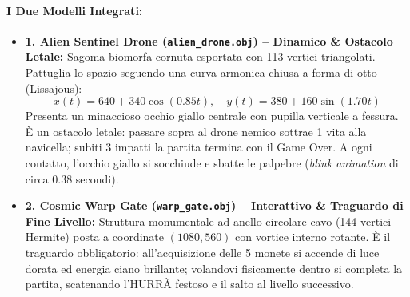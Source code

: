 \documentclass[11pt,a4paper]{article}
\begin{document}
\paragraph{I Due Modelli Integrati:}
\begin{itemize}
    \item \textbf{1. Alien Sentinel Drone (\texttt{alien\_drone.obj}) -- Dinamico \& Ostacolo Letale:}
    Sagoma biomorfa cornuta esportata con 113 vertici triangolati. Pattuglia lo spazio seguendo una curva armonica chiusa a forma di otto (Lissajous):
    \begin{equation}
    x(t) = 640 + 340 \cos(0.85 t), \quad y(t) = 380 + 160 \sin(1.70 t)
    \end{equation}
    Presenta un minaccioso occhio giallo centrale con pupilla verticale a fessura. È un ostacolo letale: passare sopra al drone nemico sottrae 1 vita alla navicella; subiti 3 impatti la partita termina con il Game Over. A ogni contatto, l'occhio giallo si socchiude e sbatte le palpebre (\textit{blink animation} di circa 0.38 secondi).
    \item \textbf{2. Cosmic Warp Gate (\texttt{warp\_gate.obj}) -- Interattivo \& Traguardo di Fine Livello:}
    Struttura monumentale ad anello circolare cavo (144 vertici Hermite) posta a coordinate $(1080, 560)$ con vortice interno rotante. È il traguardo obbligatorio: all'acquisizione delle 5 monete si accende di luce dorata ed energia ciano brillante; volandovi fisicamente dentro si completa la partita, scatenando l'HURR\`A festoso e il salto al livello successivo.
\end{itemize}
\end{document}
